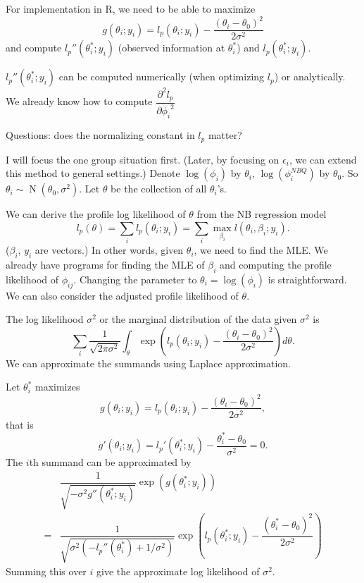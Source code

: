 \documentclass[letterpaper, 12pt]{article}
\DeclareMathOperator{\N}{N}
\newcommand{\ddpp}[2]{ \dfrac{\partial^2 #1}{ {\partial #2}^2}}
\begin{document}
For implementation in R, we need to be able to maximize
\[ g(\theta_i; y_i) = l_p(\theta_i; y_i) - \dfrac{(\theta_i - \theta_0)^2}{2 \sigma^2} \]
and compute $l_p''(\theta_i^*; y_i)$ (observed information at $\theta_i^*$) and
$l_p(\theta_i^*; y_i)$.

$l_p''(\theta_i^*; y_i)$ can be computed numerically (when optimizing $l_p$)
or analytically.  We already know how to compute $\ddpp{l_p}{\phi_i}$

Questions: does the normalizing constant in $l_p$ matter?

\newpage
I will focus the one group situation first. (Later, by focusing on
$\epsilon_i$, we can extend this method to general settings.)
Denote $\log(\phi_{i})$ by $\theta_{i}$, $\log(\phi_{i}^{NBQ})$ by $\theta_0$.
So $\theta_i \sim \N(\theta_0, \sigma^2)$.
Let $\theta$ be the collection of all $\theta_{i}$'s.

We can derive the profile log likelihood of $\theta$ from the NB regression
model \[ l_p(\theta) = \sum_i l_p(\theta_i; y_i) = \sum_i \max_{\beta_i} l(\theta_{i}, \beta_i; y_i). \]
($\beta_i$, $y_i$ are vectors.) In other words, given $\theta_i$, we need to
find the MLE. We already have programs for finding the MLE of $\beta_i$ and
computing the profile likelihood of $\phi_{ij}$. Changing the parameter to
$\theta_i = \log(\phi_i)$ is straightforward.  We can also consider the
adjusted profile likelihood of $\theta$.

The log likelihood $\sigma^2$ or the marginal distribution of the data
given $\sigma^2$ is
\[ \sum_i \dfrac{1}{ \sqrt{2 \pi \sigma^2}}\int_\theta
\exp\left(l_p(\theta_i; y_i) - \dfrac{(\theta_i - \theta_0)^2}{2 \sigma^2} \right) d\theta.  \]
We can approximate the summands using Laplace approximation.

Let $\theta_i^*$ maximizes
\[ g(\theta_i; y_i) = l_p(\theta_i; y_i) - \dfrac{(\theta_i - \theta_0)^2}{2 \sigma^2}, \]
that is
\[ g'(\theta_i; y_i) = l_p'(\theta_i^*; y_i) - \dfrac{\theta_i^* - \theta_0}{\sigma^2} = 0. \]
The $i$th summand can be approximated by
\begin{align*}
    &\dfrac{1}{ \sqrt{-\sigma^2 g''(\theta_i^*; y_i)}}
    \exp\left(g(\theta_i^*; y_i)\right)  \\
    =& \dfrac{1}{ \sqrt{\sigma^2 \left(- l_p''(\theta_i^*) +
    1/\sigma^2\right)}}
\exp\left(l_p(\theta_i^*; y_i) - \dfrac{(\theta_i^* - \theta_0)^2}{2 \sigma^2} \right)
\end{align*}
Summing this over $i$ give the approximate log likelihood of $\sigma^2$.
\end{document}

